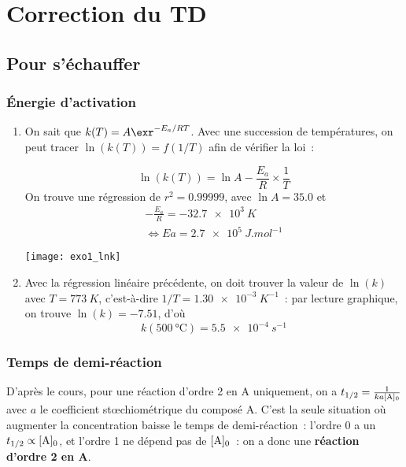 \documentclass[a4paper, 12pt, final, garamond]{book}
\begin{document}
\setcounter{chapter}{2}

\chapter{Correction du TD}

\section{Pour s'échauffer}
\subsection{Énergie d'activation}
\begin{enumerate}
    \item On sait que $k(T) = A\exr^{-E_a/RT}$. Avec une succession de
        températures, on peut tracer $\ln(k(T)) = f(1/T)$ afin de vérifier la
        loi~:

        \begin{minipage}{0.45\linewidth}
            \[\ln(k(T)) = \ln A - \frac{E_a}{R}\times \frac{1}{T}\]
            On trouve une régression de $r^2 = \num{0.99999}$, avec $\ln A =
            \num{35.0}$ et
            \begin{gather*}
                - \frac{E_a}{R} = \SI{-32.7e3}{K}\\
                \Leftrightarrow
                \boxed{Ea = \SI{2.7e5}{J.mol^{-1}}}
            \end{gather*}
        \end{minipage}
        \begin{minipage}{0.55\linewidth}
            \begin{center}
                \texttt{[image: exo1\_lnk]}
            \end{center}
        \end{minipage}
    \item Avec la régression linéaire précédente, on doit trouver la valeur de
        $\ln(k)$ avec $T = \SI{773}{K}$, c'est-à-dire $1/T =
        \SI{1.30e-3}{K^{-1}}$~: par lecture graphique, on trouve $\ln(k) =
        -\num{7.51}$, d'où
        \[\boxed{k(\SI{500}{\degreeCelsius}) = \SI{5.5e-4}{s^{-1}}}\]
\end{enumerate}

\subsection{Temps de demi-réaction}
D'après le cours, pour une réaction d'ordre 2 en A uniquement, on a $t_{1/2} =
\frac{1}{ka[{\rm A}]_0}$ avec $a$ le coefficient stœchiométrique du composé A.
C'est la seule situation où augmenter la concentration baisse le temps de
demi-réaction~: l'ordre 0 a un $t_{1/2} \propto [{\rm A}]_0$, et l'ordre 1 ne
dépend pas de $[{\rm A}]_0$~: on a donc une \textbf{réaction d'ordre 2 en A}.
\end{document}
